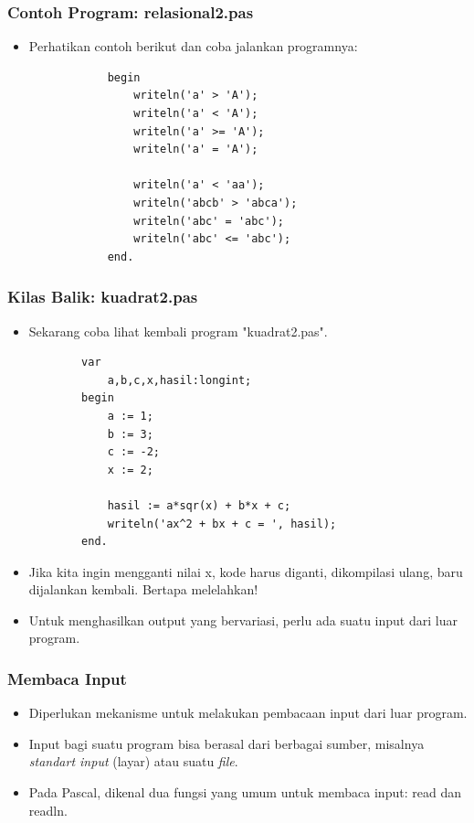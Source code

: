 \documentclass{beamer}
\begin{document}
\begin{frame}[fragile]
\frametitle{Contoh Program: relasional2.pas}
\begin{itemize}
	\item Perhatikan contoh berikut dan coba jalankan programnya:
		\begin{lstlisting}
			begin
			    writeln('a' > 'A');
			    writeln('a' < 'A');
			    writeln('a' >= 'A');
			    writeln('a' = 'A');

			    writeln('a' < 'aa');
			    writeln('abcb' > 'abca');
			    writeln('abc' = 'abc');
			    writeln('abc' <= 'abc');
			end.
		\end{lstlisting}
\end{itemize}
\end{frame}


\begin{frame}[fragile]
\frametitle{Kilas Balik: kuadrat2.pas}
\begin{itemize}
	\item Sekarang coba lihat kembali program "kuadrat2.pas".
	\begin{lstlisting}
		var
		    a,b,c,x,hasil:longint;
		begin
		    a := 1;
		    b := 3;
		    c := -2;
		    x := 2;	    

		    hasil := a*sqr(x) + b*x + c;
		    writeln('ax^2 + bx + c = ', hasil);
		end.
	\end{lstlisting}
	\item Jika kita ingin mengganti nilai x, kode harus diganti, dikompilasi ulang, baru dijalankan kembali. Bertapa melelahkan!
	\item Untuk menghasilkan output yang bervariasi, perlu ada suatu input dari luar program.
\end{itemize}
\end{frame}

\begin{frame}
\frametitle{Membaca Input}
\begin{itemize}	
	\item Diperlukan mekanisme untuk melakukan pembacaan input dari luar program.
	\item Input bagi suatu program bisa berasal dari berbagai sumber, misalnya \textit{standart input} (layar) atau suatu \textit{file}.
	\item Pada Pascal, dikenal dua fungsi yang umum untuk membaca input: \alert{read} dan \alert{readln}.
\end{itemize}
\end{frame}
\end{document}
